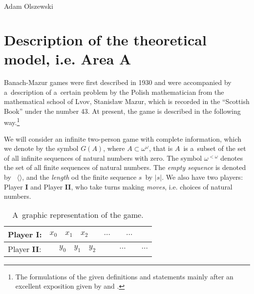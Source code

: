 \begin{artengenv}{Adam Olszewski}
\section{Description of the theoretical model, i.e. Area A}
Banach-Mazur games were first described in 1930 and were accompanied by a~description of a~certain problem by the Polish mathematician from the mathematical school of Lvov, Stanisław Mazur, which is recorded in the ``Scottish Book'' under the number 43. At present, the game is described in the following way.\footnote{The formulations of the given definitions and statements mainly after an excellent exposition given by
\parencite[][]{khomskii_infinite_2010} %
 and 
\parencite[][]{soare_turing_2016}.%
}

We will consider an infinite two-person game with complete information, which we denote by the symbol $G(A)$, where $A\subset\omega^{\omega}$, that is $A$~is a~subset of the set of all infinite sequences of natural numbers with zero. The symbol $\omega^{<\omega}$ denotes the set of all finite sequences of natural numbers. The \textit{empty sequence} is denoted by~%
${\langle}{\rangle}$, and the \textit{length} od the finite sequence $s$~by $|s|$. We also have two players: Player \textbf{I} and Player \textbf{II}, who take turns making \textit{moves}, i.e. choices of natural numbers.





\begin{table}[H]
\begin{small}

\begin{tabular}{|p{}|p{}|}
\hline
Player \textbf{I}: &
$x_{0} \quad x_{1} \quad x_{2} \qquad \ldots \qquad \ldots$\\\hline
Player \textbf{II}: &
$\ \quad y_{0} \quad y_{1} \quad y_{2} \qquad \quad\ldots \qquad \ldots$\\\hline
\end{tabular}
\end{small}
\caption{A~graphic representation of the game.}

\end{table}


\end{artengenv}
